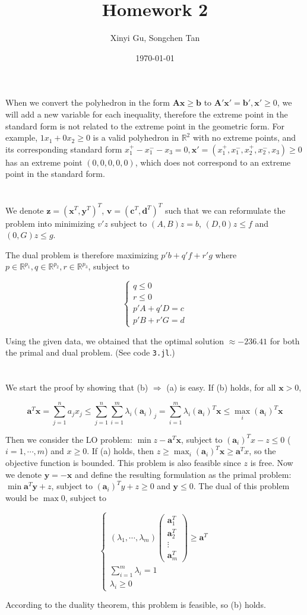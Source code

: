 \documentclass{article}
\title{Homework 2}
\author{Xinyi Gu, Songchen Tan}
\date{\today}
\newcommand{\A}{\bm A}
\newcommand{\x}{\bm x}
\newcommand{\y}{\bm y}
\newcommand{\z}{\bm z}
\renewcommand{\a}{\bm a}
\renewcommand{\b}{\bm b}
\renewcommand{\c}{\bm c}
\renewcommand{\d}{\bm d}
\renewcommand{\v}{\bm v}
\newcommand{\1}{\bm 1}
\begin{document}
\maketitle
\section{}
When we convert the polyhedron in the form $\A\x\ge\b$ to $\A'\x'=\b',\x'\ge0$, we will add a new variable for each inequality, therefore the extreme point in the standard form is not related to the extreme point in the geometric form. For example, $1x_1+0x_2\ge0$ is a valid polyhedron in $\mathbb R^2$ with no extreme points, and its corresponding standard form $x_1^+-x_1^--x_3=0, \x'=(x_1^+,x_1^-,x_2^+,x_2^-,x_3)\ge0$ has an extreme point $(0, 0, 0, 0, 0)$, which does not correspond to an extreme point in the standard form.

\section{}
We denote $\z=(\x^T,\y^T)^T$, $\v=(\c^T,\d^T)^T$ such that we can reformulate the problem into minimizing $v'z$ subject to $(A, B)z=b$, $(D, 0)z\le f$ and $(0, G)z\le g$.

The dual problem is therefore maximizing $p'b+q'f+r'g$ where $p\in\mathbb R^{p_1}, q\in\mathbb R^{p_2}, r\in\mathbb R^{p_3}$, subject to

$$
\begin{cases}
    q\le 0\\
    r\le 0\\
    p'A+q'D=c\\
    p'B+r'G=d
\end{cases}
$$

Using the given data, we obtained that the optimal solution $\approx -236.41$ for both the primal and dual problem. (See code \verb|3.jl|.)
\section{}

We start the proof by showing that (b) $\Rightarrow$ (a) is easy. If (b) holds, for all $\x>0$,

$$
\a^T\x=\sum_{j=1}^na_jx_j
\le\sum_{j=1}^n\sum_{i=1}^m\lambda_i(\a_{i})_j
=\sum_{i=1}^m\lambda_i(\a_i)^T\x\le\max_i(\a_i)^T\x
$$

Then we consider the LO problem: $\min z-\a^T\x$, subject to $(\a_i)^Tx-z\le 0$ ($i=1,\cdots,m$) and $x\ge0$. If (a) holds, then $z\ge\max_i(\a_i)^T\x\ge\a^Tx$, so the objective function is bounded. This problem is also feasible since $z$ is free. Now we denote $\y=-\x$ and define the resulting formulation as the primal problem: $\min \a^T\y+z$, subject to $(\a_i)^Ty+z\ge 0$ and $\y\le 0$. The dual of this problem would be $\max 0$, subject to

$$
\begin{cases}
(\lambda_1,\cdots,\lambda_m)\begin{pmatrix}
    \a_1^T\\\a_2^T\\\vdots\\\a_m^T
\end{pmatrix}
\ge\a^T\\
\sum_{i=1}^m\lambda_i=1\\
\lambda_i\ge0
\end{cases}
$$

According to the duality theorem, this problem is feasible, so (b) holds.
\end{document}
